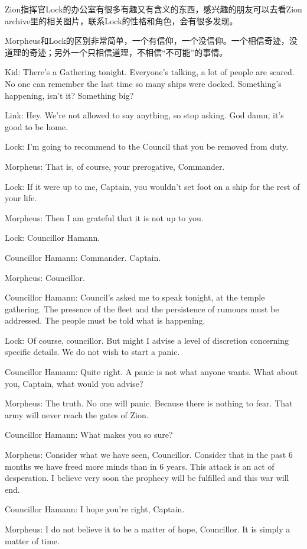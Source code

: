 \documentclass[UTF8]{ctexart}
\newenvironment{myquote}{\color{green} \setlength{\leftskip}{6em} \setlength{\rightskip}{4em} \setlength{\parindent}{-2em}}{\par}
\begin{document}
Zion指挥官Lock的办公室有很多有趣又有含义的东西，感兴趣的朋友可以去看Zion archive里的相关图片，联系Lock的性格和角色，会有很多发现。

Morpheus和Lock的区别非常简单，一个有信仰，一个没信仰。一个相信奇迹，没道理的奇迹；另外一个只相信道理，不相信“不可能”的事情。

\begin{myquote}
Kid: There's a Gathering tonight. Everyone's talking, a lot of people are scared. No one can remember the last time so many ships were docked. Something's happening, isn't it? Something big?

Link: Hey. We're not allowed to say anything, so stop asking. God damn, it's good to be home.

Lock: I'm going to recommend to the Council that you be removed from duty.

Morpheus: That is, of course, your prerogative, Commander.

Lock: If it were up to me, Captain, you wouldn't set foot on a ship for the rest of your life.

Morpheus: Then I am grateful that it is not up to you.

Lock: Councillor Hamann.

Councillor Hamann: Commander. Captain.

Morpheus: Councillor.

Councillor Hamann: Council's asked me to speak tonight, at the temple gathering. The presence of the fleet and the persistence of rumours must be addressed. The people must be told what is happening.

Lock: Of course, councillor. But might I advise a level of discretion concerning specific details. We do not wish to start a panic.

Councillor Hamann: Quite right. A panic is not what anyone wants. What about you, Captain, what would you advise?

Morpheus: The truth. No one will panic. Because there is nothing to fear. That army will never reach the gates of Zion.

Councillor Hamann: What makes you so sure?

Morpheus: Consider what we have seen, Councillor. Consider that in the past 6 months we have freed more minds than in 6 years. This attack is an act of desperation. I believe very soon the prophecy will be fulfilled and this war will end.

Councillor Hamann: I hope you're right, Captain.

Morpheus: I do not believe it to be a matter of hope, Councillor. It is simply a matter of time.
\end{myquote}
\end{document}

